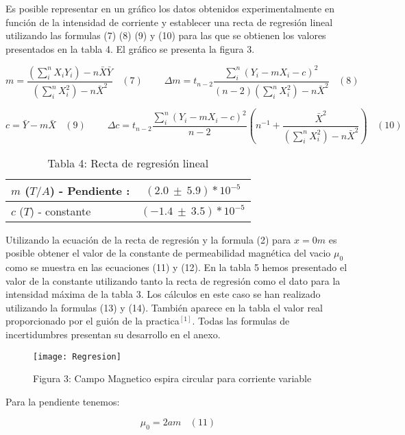 \documentclass[article, 11pt]{report}
\begin{document}
Es posible representar en un gráfico los datos obtenidos experimentalmente en función de la intensidad de corriente y establecer una recta de regresión lineal utilizando las formulas (7) (8) (9) y (10) para las que se obtienen los valores presentados en la tabla 4. El gráfico se presenta la figura 3.

$$m=\dfrac{\left(\sum_{i}^{n} X_i Y_i \right)- n\bar{X}\bar{Y}}{(\sum_{i}^{n} X_i ^2) - n\bar{X}^2} ~~~~ (7) ~~~~~~~~~~ \Delta m = t_{n-2} \dfrac{\sum_{i}^{n} (Y_i - mX_i -c)^2}{(n-2)(\sum_{i}^{n} X_i ^2 )- n\bar{X}^2} ~~~~(8)$$



$$ c= \bar{Y} - m\bar{X} ~~~~ (9) ~~~~~~~~~~ \Delta c = t_{n-2} \dfrac{\sum_{i}^{n} (Y_i - mX_i -c)^2}{n-2}\left( n^{-1} + \dfrac{ \bar{X}^2}{(\sum_{i}^{n} X_i ^2) - n\bar{X}^2} \right) ~~~~(10)$$ 


\begin{table}[H]
	\begin{center}
		\begin{tabular}{ |m{7.5cm}  |   c  | }
			\hline
			$m$ ($T/A$) - Pendiente :  &   $ (2.0 ~\pm~ 5.9 )*10^{-5}$ \\ \hline
			$ c$ ($T$) -  constante	 &  $( -1.4 ~\pm~ 3.5)*10^{-5} $ \\  \hline
		\end{tabular}
		\label{Tab:1}
		\caption*{Tabla 4: Recta de regresión lineal}
	\end{center}
\end{table}


Utilizando la ecuación de la recta de regresión y la formula (2) para $x=0m$ es posible obtener el valor de la constante de permeabilidad magnética del vacio $\mu_0$ como se muestra en las ecuaciones (11) y (12). En la tabla 5 hemos presentado el valor de la constante utilizando tanto la recta de regresión como el dato para la intensidad máxima de la tabla 3. Los cálculos en este caso se han realizado utilizando la formulas (13) y (14). También aparece en la tabla  el valor real proporcionado por el guión de la practica$^[1]$. Todas las formulas de incertidumbres presentan su desarrollo en el anexo.

\begin{figure}[H]
	\texttt{[image: Regresion]}
	\caption*{Figura 3: Campo Magnetico espira circular para corriente variable}
\end{figure}

Para la pendiente tenemos:

$$ \mu_0 = 2am ~~~~ (11)$$ 
\end{document}
